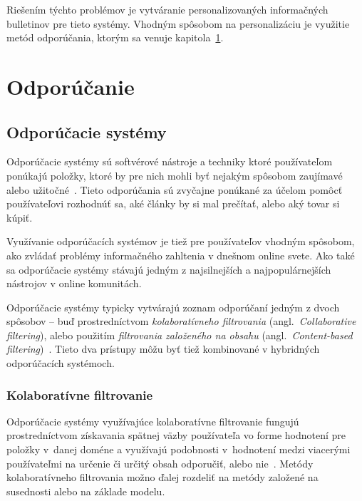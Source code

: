 Riešením týchto problémov je vytváranie personalizovaných informačných bulletinov pre tieto systémy. Vhodným spôsobom
na personalizáciu je využitie metód odporúčania, ktorým sa venuje kapitola~\ref{rec}.




\afterpage{\blankpage}
\chapter{Odporúčanie}\label{rec}

\section{Odporúčacie systémy}

Odporúčacie systémy sú softvérové nástroje a techniky ktoré používateľom ponúkajú položky, ktoré by pre nich mohli
byť nejakým spôsobom zaujímavé alebo užitočné~\cite{Handbook2011}. Tieto odporúčania sú zvyčajne ponúkané za účelom
pomôcť používateľovi rozhodnúť sa, aké články by si mal prečítať, alebo aký tovar si kúpiť.

Využívanie odporúčacích systémov je tiež pre používateľov vhodným spôsobom, ako zvládať problémy informačného zahltenia
v dnešnom online svete. Ako také sa odporúčacie systémy stávajú jedným z najsilnejších a najpopulárnejších nástrojov
v online komunitách.

Odporúčacie systémy typicky vytvárajú zoznam odporúčaní jedným z dvoch spôsobov -- buď prostredníctvom \emph{kolaboratívneho
filtrovania} (angl.~\emph{Collaborative filtering}), alebo použitím \emph{filtrovania založeného na obsahu}
(angl.~\emph{Content-based filtering})~\cite{Buhmann2011}. Tieto dva prístupy môžu byť tiež kombinované
v hybridných odporúčacích systémoch.

\subsection{Kolaboratívne filtrovanie}\label{rec:collab}

Odporúčacie systémy využívajúce kolaboratívne filtrovanie fungujú prostredníctvom získavania spätnej väzby používateľa
vo forme hodnotení pre položky v~danej doméne a využívajú podobnosti v~hodnotení medzi viacerými používateľmi na určenie
či určitý obsah odporučiť, alebo nie~\cite{Buhmann2011}. Metódy kolaboratívneho filtrovania možno ďalej rozdeliť
na metódy založené na susednosti alebo na základe modelu.

